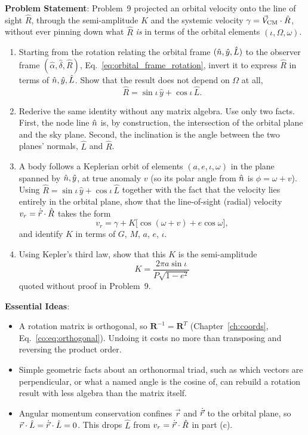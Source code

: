 \textbf{Problem Statement}: Problem~9 projected an orbital velocity onto the line of sight $\hat R$, through the semi-amplitude $K$ and the systemic velocity $\gamma=\vec V_{\rm CM}\cdot\hat R$, without ever pinning down what $\hat R$ \emph{is} in terms of the orbital elements $(\iota,\Omega,\omega)$.
\begin{enumerate}[label=(\alph*)]
	\item Starting from the rotation relating the orbital frame $(\hat n,\hat y,\hat L)$ to the observer frame $(\hat\alpha,\hat\delta,\hat R)$, Eq.~\eqref{eq:orbital_frame_rotation}, invert it to express $\hat R$ in terms of $\hat n,\hat y,\hat L$. Show that the result does not depend on $\Omega$ at all,
	\[
	\hat R = \sin\iota\,\hat y+\cos\iota\,\hat L.
	\]
	\item Rederive the same identity without any matrix algebra. Use only two facts. First, the node line $\hat n$ is, by construction, the intersection of the orbital plane and the sky plane. Second, the inclination is the angle between the two planes' normals, $\hat L$ and $\hat R$.
	\item A body follows a Keplerian orbit of elements $(a,e,\iota,\omega)$ in the plane spanned by $\hat n,\hat y$, at true anomaly $v$ (so its polar angle from $\hat n$ is $\phi=\omega+v$). Using $\hat R=\sin\iota\,\hat y+\cos\iota\,\hat L$ together with the fact that the velocity lies entirely in the orbital plane, show that the line-of-sight (radial) velocity $v_r=\dot{\vec r}\cdot\hat R$ takes the form
	\[
	v_r = \gamma + K\big[\cos(\omega+v)+e\cos\omega\big],
	\]
	and identify $K$ in terms of $G$, $M$, $a$, $e$, $\iota$.
	\item Using Kepler's third law, show that this $K$ is the semi-amplitude
	\[
	K=\frac{2\pi a\sin\iota}{P\sqrt{1-e^2}}
	\]
	quoted without proof in Problem~9.
\end{enumerate}

\textbf{Essential Ideas}:
\begin{itemize}
	\item A rotation matrix is orthogonal, so $\mathbf R^{-1}=\mathbf R^T$ (Chapter~\ref{ch:coords}, Eq.~\eqref{co:eq:orthogonal}). Undoing it costs no more than transposing and reversing the product order.
	\item Simple geometric facts about an orthonormal triad, such as which vectors are perpendicular, or what a named angle is the cosine of, can rebuild a rotation result with less algebra than the matrix itself.
	\item Angular momentum conservation confines $\vec r$ and $\dot{\vec r}$ to the orbital plane, so $\vec r\cdot\hat L=\dot{\vec r}\cdot\hat L=0$. This drops $\hat L$ from $v_r=\dot{\vec r}\cdot\hat R$ in part (c).
\end{itemize}

